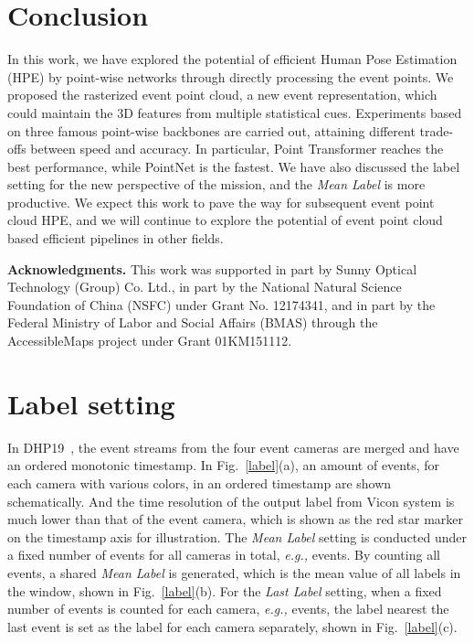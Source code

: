 \documentclass[10pt,twocolumn,letterpaper]{article}
\begin{document}
\section{Conclusion}
In this work, we have explored the potential of efficient Human Pose Estimation (HPE) by point-wise networks through directly processing the event points. We proposed the rasterized event point cloud, a new event representation, which could maintain the 3D features from multiple statistical cues.
Experiments based on three famous point-wise backbones are carried out, attaining different trade-offs between speed and accuracy.
In particular, Point Transformer reaches the best performance, while PointNet is the fastest.
We have also discussed the label setting for the new perspective of the mission, and the \emph{Mean Label} is more productive.
We expect this work to pave the way for subsequent event point cloud HPE, and we will continue to explore the potential of event point cloud based efficient pipelines in other fields.

\noindent\textbf{Acknowledgments.}
This work was supported in part by Sunny Optical Technology (Group) Co. Ltd., in part by the National Natural Science Foundation of China (NSFC) under Grant No. 12174341, and in part by the Federal Ministry of Labor and Social Affairs (BMAS) through the AccessibleMaps project under Grant 01KM151112.

\clearpage
{\small


}

\newpage
\appendix
\section{Label setting}

In DHP19~\cite{calabrese2019dhp19}, the event streams from the four event cameras are merged and have an ordered monotonic timestamp. In Fig.~\ref{label}(a), an amount of  events,  for each camera with various colors, in an ordered timestamp are shown schematically.
And the time resolution of the output label from Vicon system is much lower than that of the event camera, which is shown as the red star marker on the timestamp axis for illustration. The \emph{Mean Label} setting is conducted under a fixed number of events for all cameras in total, \textit{e.g.,}  events. By counting all events, a shared \emph{Mean Label} is generated, which is the mean value of all labels in the window, shown in Fig.~\ref{label}(b). For the \emph{Last Label} setting, when a fixed number of events is counted for each camera, \textit{e.g.,}  events, the label nearest the last event is set as the label for each camera separately, shown in Fig.~\ref{label}(c).
\end{document}
